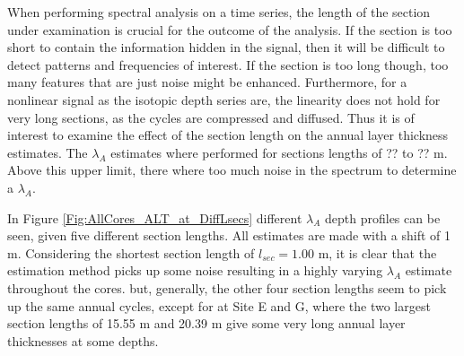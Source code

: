 \documentclass[../../CompleteThesis2/Complete_2ndDraft]{subfiles}
\begin{document}
When performing spectral analysis on a time series, the length of the section under examination is crucial for the outcome of the analysis. If the section is too short to contain the information hidden in the signal, then it will be difficult to detect patterns and frequencies of interest. If the section is too long though, too many features that are just noise might be enhanced. Furthermore, for a nonlinear signal as the isotopic depth series are, the linearity does not hold for very long sections, as the cycles are compressed and diffused. Thus it is of interest to examine the effect of the section length on the annual layer thickness estimates. The $\lambda_A$ estimates where performed for sections lengths of ?? to ?? m. Above this upper limit, there where too much noise in the spectrum to determine a $\lambda_A$.

In Figure \ref{Fig:AllCores_ALT_at_DiffLsecs} different $\lambda_A$ depth profiles can be seen, given five different section lengths. All estimates are made with a shift of 1 m. Considering the shortest section length of $l_{sec}=1.00$ m, it is clear that the estimation method picks up some noise resulting in a highly varying $\lambda_A$ estimate throughout the cores. but, generally, the other four section lengths seem to pick up the same annual cycles, except for at Site E and G, where the two largest section lengths of 15.55 m and 20.39 m give some very long annual layer thicknesses at some depths.
\end{document}
